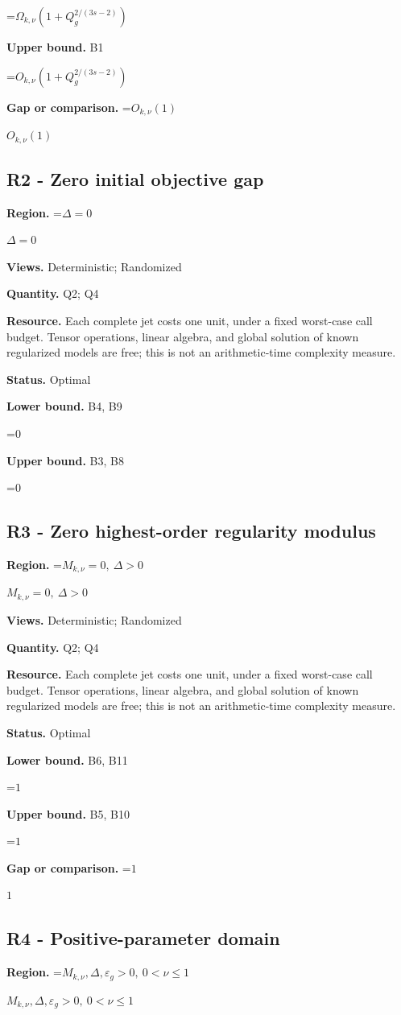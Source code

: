 \documentclass[10pt,a4paper]{article}
\newcommand{\AtlasMath}[1]{\par\begingroup\centering\setbox0=\hbox{$\displaystyle #1$}\ifdim\wd0>1.4\linewidth\typeout{ATLAS WIDE FORMULA: \the\wd0}\fi\ifdim\wd0>\linewidth\resizebox{\linewidth}{!}{\box0}\else\box0\fi\par\endgroup}
\newcommand{\AtlasInlineMath}[1]{\begingroup\setbox0=\hbox{$#1$}\ifdim\wd0>.4\linewidth\endgroup\AtlasMath{#1}\else\endgroup$#1$\fi}
\begin{document}
\AtlasMath{\Omega_{k,\nu}(1+Q_g^{2/(3s-2)})}
\textbf{Upper bound.} B1

\AtlasMath{O_{k,\nu}(1+Q_g^{2/(3s-2)})}
\textbf{Gap or comparison.} \AtlasInlineMath{O_{k,\nu}(1)}

\subsection{R2 - Zero initial objective gap}
\textbf{Region.} \AtlasInlineMath{\Delta=0}

\textbf{Views.} Deterministic; Randomized

\textbf{Quantity.} Q2; Q4

\textbf{Resource.} Each complete jet costs one unit, under a fixed worst-case call budget. Tensor operations, linear algebra, and global solution of known regularized models are free; this is not an arithmetic-time complexity measure.

\textbf{Status.} Optimal

\textbf{Lower bound.} B4, B9

\AtlasMath{0}
\textbf{Upper bound.} B3, B8

\AtlasMath{0}
\subsection{R3 - Zero highest-order regularity modulus}
\textbf{Region.} \AtlasInlineMath{M_{k,\nu}=0,\ \Delta>0}

\textbf{Views.} Deterministic; Randomized

\textbf{Quantity.} Q2; Q4

\textbf{Resource.} Each complete jet costs one unit, under a fixed worst-case call budget. Tensor operations, linear algebra, and global solution of known regularized models are free; this is not an arithmetic-time complexity measure.

\textbf{Status.} Optimal

\textbf{Lower bound.} B6, B11

\AtlasMath{1}
\textbf{Upper bound.} B5, B10

\AtlasMath{1}
\textbf{Gap or comparison.} \AtlasInlineMath{1}

\subsection{R4 - Positive-parameter domain}
\textbf{Region.} \AtlasInlineMath{M_{k,\nu},\Delta,\varepsilon_g>0,\ 0<\nu\le1}
\end{document}
